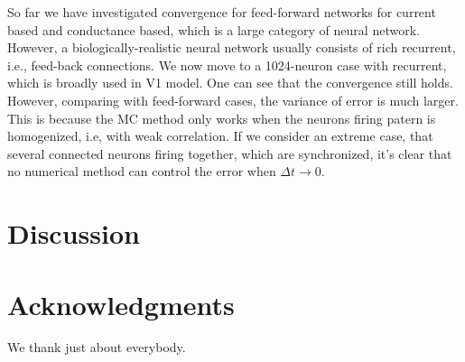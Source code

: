 \documentclass[10pt]{article}
\begin{document}
\begin{multicols}{2}
So far we have investigated convergence for feed-forward networks for current based and conductance based, which is a large category of neural network. However, a biologically-realistic neural network usually consists of rich recurrent, i.e., feed-back connections. We now move to a 1024-neuron case with recurrent, which is broadly used in V1 model. One can see that the convergence still holds. However, comparing with feed-forward cases, the variance of error is much larger. This is because the MC method only works when the neurons firing patern is homogenized, i.e, with weak correlation. If we consider an extreme case, that several connected neurons firing together, which are synchronized, it's clear that no numerical method can control the error when $\Delta t \rightarrow 0$.

\section*{Discussion}



\section*{Acknowledgments}
We thank just about everybody.


\end{multicols}
\end{document}
